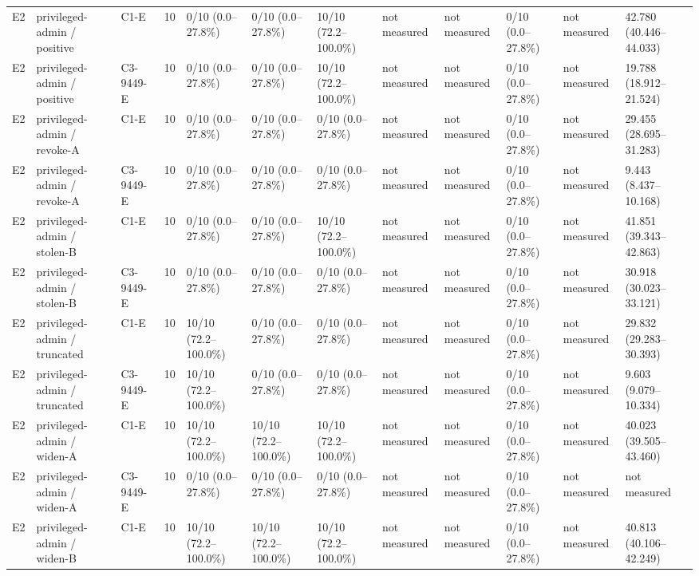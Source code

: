\begin{tabular}{llllllllllll}
E2 & privileged-admin / positive & C1-E & 10 & 0/10 (0.0--27.8\%) & 0/10 (0.0--27.8\%) & 10/10 (72.2--100.0\%) & not measured & not measured & 0/10 (0.0--27.8\%) & not measured & 42.780 (40.446--44.033) \\
E2 & privileged-admin / positive & C3-9449-E & 10 & 0/10 (0.0--27.8\%) & 0/10 (0.0--27.8\%) & 10/10 (72.2--100.0\%) & not measured & not measured & 0/10 (0.0--27.8\%) & not measured & 19.788 (18.912--21.524) \\
E2 & privileged-admin / revoke-A & C1-E & 10 & 0/10 (0.0--27.8\%) & 0/10 (0.0--27.8\%) & 0/10 (0.0--27.8\%) & not measured & not measured & 0/10 (0.0--27.8\%) & not measured & 29.455 (28.695--31.283) \\
E2 & privileged-admin / revoke-A & C3-9449-E & 10 & 0/10 (0.0--27.8\%) & 0/10 (0.0--27.8\%) & 0/10 (0.0--27.8\%) & not measured & not measured & 0/10 (0.0--27.8\%) & not measured & 9.443 (8.437--10.168) \\
E2 & privileged-admin / stolen-B & C1-E & 10 & 0/10 (0.0--27.8\%) & 0/10 (0.0--27.8\%) & 10/10 (72.2--100.0\%) & not measured & not measured & 0/10 (0.0--27.8\%) & not measured & 41.851 (39.343--42.863) \\
E2 & privileged-admin / stolen-B & C3-9449-E & 10 & 0/10 (0.0--27.8\%) & 0/10 (0.0--27.8\%) & 0/10 (0.0--27.8\%) & not measured & not measured & 0/10 (0.0--27.8\%) & not measured & 30.918 (30.023--33.121) \\
E2 & privileged-admin / truncated & C1-E & 10 & 10/10 (72.2--100.0\%) & 0/10 (0.0--27.8\%) & 0/10 (0.0--27.8\%) & not measured & not measured & 0/10 (0.0--27.8\%) & not measured & 29.832 (29.283--30.393) \\
E2 & privileged-admin / truncated & C3-9449-E & 10 & 10/10 (72.2--100.0\%) & 0/10 (0.0--27.8\%) & 0/10 (0.0--27.8\%) & not measured & not measured & 0/10 (0.0--27.8\%) & not measured & 9.603 (9.079--10.334) \\
E2 & privileged-admin / widen-A & C1-E & 10 & 10/10 (72.2--100.0\%) & 10/10 (72.2--100.0\%) & 10/10 (72.2--100.0\%) & not measured & not measured & 0/10 (0.0--27.8\%) & not measured & 40.023 (39.505--43.460) \\
E2 & privileged-admin / widen-A & C3-9449-E & 10 & 0/10 (0.0--27.8\%) & 0/10 (0.0--27.8\%) & 0/10 (0.0--27.8\%) & not measured & not measured & 0/10 (0.0--27.8\%) & not measured & not measured \\
E2 & privileged-admin / widen-B & C1-E & 10 & 10/10 (72.2--100.0\%) & 10/10 (72.2--100.0\%) & 10/10 (72.2--100.0\%) & not measured & not measured & 0/10 (0.0--27.8\%) & not measured & 40.813 (40.106--42.249) \\

\end{tabular}
